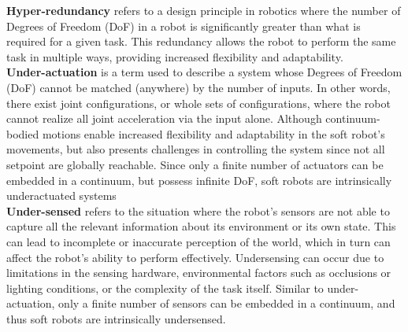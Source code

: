 \noindent \textbf{Hyper-redundancy}  refers to a design principle in robotics where the number of Degrees of Freedom (DoF) in a robot is significantly greater than what is required for a given task. This redundancy allows the robot to perform the same task in multiple ways, providing increased flexibility and adaptability.
\\

\noindent \textbf{Under-actuation} is a term used to describe a system whose Degrees of Freedom (DoF) cannot be matched (anywhere) by the number of inputs. In other words, there exist joint configurations, or whole sets of configurations, where the robot cannot realize all joint acceleration via the input alone. Although continuum-bodied motions enable increased flexibility and adaptability in the soft robot's movements, but also presents challenges in controlling the system since not all setpoint are globally reachable. Since only a finite number of actuators can be embedded in a continuum, but possess infinite DoF, soft robots are intrinsically underactuated systems \\

\noindent \textbf{Under-sensed} refers to the situation where the robot's sensors are not able to capture all the relevant information about its environment or its own state. This can lead to incomplete or inaccurate perception of the world, which in turn can affect the robot's ability to perform effectively. Undersensing can occur due to limitations in the sensing hardware, environmental factors such as occlusions or lighting conditions, or the complexity of the task itself. Similar to under-actuation, only a finite number of sensors can be embedded in a continuum, and thus soft robots are intrinsically undersensed. \\